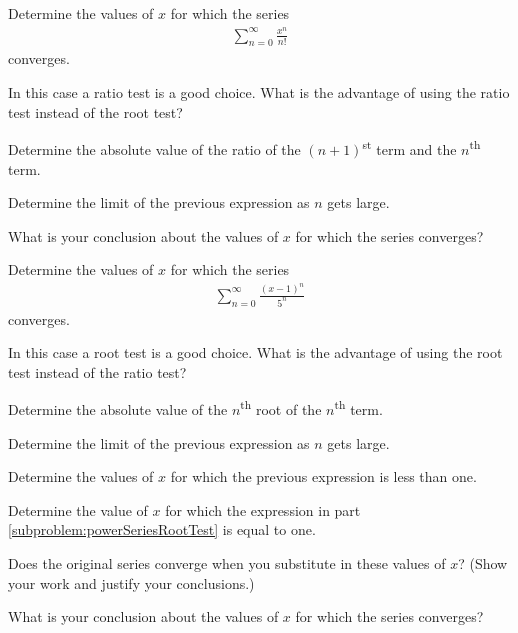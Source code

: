 \begin{problem}
\item Determine the values of $x$ for which the series
\begin{eqnarray*}
  \sum^\infty_{n=0} \frac{x^n}{n!}
\end{eqnarray*}
converges.
\begin{subproblem}
  \item In this case a ratio test is a good choice. What is the advantage of using the ratio test instead of the root test?
    \vspace{2em}
  \item Determine the absolute value of the ratio of the $(n+1)$\textsuperscript{st} term and the $n$\textsuperscript{th} term.
    \vfill
  \item Determine the limit of the previous expression as $n$ gets large.
    \vfill
  \item What is your conclusion about the values of $x$ for which the series converges?
    \vspace{2em}
\end{subproblem}

\clearpage

\item Determine the values of $x$ for which the series
\begin{eqnarray*}
  \sum^\infty_{n=0} \frac{(x-1)^n}{5^n}
\end{eqnarray*}
converges.
\begin{subproblem}
  \item In this case a root test is a good choice. What is the advantage of using the root test instead of the ratio test?
    \vspace{2em}
  \item Determine the absolute value of the $n$\textsuperscript{th} root of the $n$\textsuperscript{th} term.
    \vfill
  \item Determine the limit of the previous expression as $n$ gets large.
    \label{subproblem:powerSeriesRootTest}
    \vfill
  \item Determine the values of $x$ for which the previous expression is less than one.
    \vfill
    \clearpage
  \item Determine the value of $x$ for which the expression in part \ref{subproblem:powerSeriesRootTest} is equal to one.
  \vfill
  \item Does the original series converge when you substitute in these values of $x$? (Show your work and justify your conclusions.)
    \vfill
    \vfill
    \vfill
  \item What is your conclusion about the values of $x$ for which the series converges?
    \vspace{2em}
\end{subproblem}


\end{problem}
